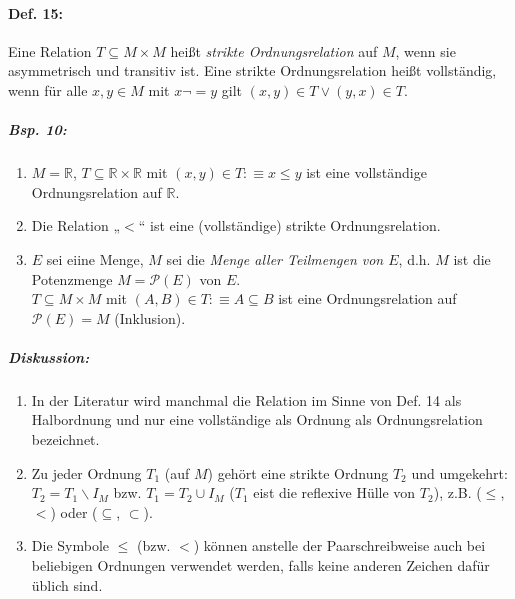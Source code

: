 \paragraph{Def. 15:} \parskp
Eine Relation $T\subseteq M \times M$ heißt \emph{strikte Ordnungsrelation} auf $M$, wenn sie asymmetrisch und transitiv ist. Eine strikte Ordnungsrelation heißt vollständig, wenn für alle $x,y \in M$ mit $x\neg = y$ gilt $(x,y) \in T \vee (y,x) \in T$.

\subparagraph{Bsp. 10:}
\begin{enumerate} [label=\alph*)]
\item $M = \mathbb{R}$, $T\subseteq \mathbb{R} \times \mathbb{R}$ mit $\boxed{(x,y) \in T :\equiv x \leq y}$ ist eine vollständige Ordnungsrelation auf $\mathbb{R}$.
\item Die Relation „$<$“ ist eine (vollständige) strikte Ordnungsrelation.
\item $E$ sei eiine Menge, $M$ sei die \emph{Menge aller Teilmengen von $E$}, d.h. $M$ ist die Potenzmenge $M=\mathcal{P}(E)$ von $E$.\\
$T \subseteq M \times M$ mit $\boxed{(A,B)\in T :\equiv A \subseteq B}$ ist eine Ordnungsrelation auf $\mathcal{P}(E)=M$ (Inklusion).
\end{enumerate}

\subparagraph{Diskussion:}
\begin{enumerate}
\item In der Literatur wird manchmal die Relation im Sinne von Def. 14 als Halbordnung und nur eine vollständige als Ordnung als Ordnungsrelation bezeichnet.
\item Zu jeder Ordnung $T_1$ (auf $M$) gehört eine strikte Ordnung $T_2$ und umgekehrt: $T_2=T_1\backslash I_M$ bzw. $T_1=T_2 \cup I_M$ ($T_1$ eist die reflexive Hülle von $T_2$), z.B. ($\leq$, $<$) oder ($\subseteq$, $\subset$).
\item Die Symbole $\leq$ (bzw. $<$) können anstelle der Paarschreibweise auch bei beliebigen Ordnungen verwendet werden, falls keine anderen Zeichen dafür üblich sind.
\end{enumerate}

